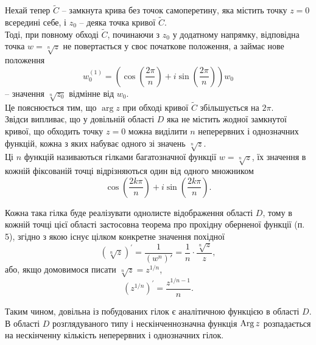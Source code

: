 Нехай тепер $\tilde{C}$ -- замкнута крива без точок самоперетину, яка містить точку $z = 0$ всередині себе, і $z_0$ -- деяка точка кривої $\tilde{C}$. \\

Тоді, при повному обході $\tilde{C}$, починаючи з $z_0$ у додатному напрямку, відповідна точка $w = \sqrt[n]{z}$ не повертається у своє початкове положення, а займає нове положення
\begin{equation}
	\label{eq:3.1.10}
	w_0^{(1)} = \left(\cos \left( \dfrac{2 \pi}{n} \right) + i \sin \left( \dfrac{2 \pi}{n} \right) \right) w_0
\end{equation} -- значення $\sqrt[n]{z_0}$ відмінне від $w_0$. \\

Це пояснюється тим, що $\arg z$ при обході кривої $\tilde{C}$ збільшується на $2 \pi$. \\

Звідси випливає, що у довільній області $D$ яка не містить жодної замкнутої кривої, що обходить точку $z = 0$ можна виділити $n$ неперервних і однозначних функцій, кожна з яких набуває одного зі значень $\sqrt[n]{z}$. \\

Ці $n$ функцій називаються гілками багатозначної функції $w = \sqrt[n]{z}$, їх значення в кожній фіксованій точці відрізняються один від одного множником
\begin{equation}
	\label{eq:3.1.11}
	\cos \left( \dfrac{2 k \pi}{n} \right) + i \sin \left( \dfrac{2 k \pi}{n} \right).
\end{equation}

Кожна така гілка буде реалізувати однолисте відображення області $D$, тому в кожній точці цієї області застосовна теорема про прохідну оберненої функції (п. 5), згідно з якою існує цілком конкретне значення похідної
\begin{equation}
	\label{eq:3.1.12}
	\left( \sqrt[n]{z} \right)^\prime = \dfrac{1}{(w^n)'} = \dfrac{1}{n} \cdot \dfrac{\sqrt[n]{z}}{z},
\end{equation}
або, якщо домовимося писати $\sqrt[n]{z} = z^{1 / n}$,
\begin{equation}
	\label{eq:3.1.13}
	\left( z^{1 / n} \right)^\prime = \dfrac{z^{1 / n - 1}}{n}.
\end{equation}

Таким чином, довільна із побудованих гілок є аналітичною функцією в області $D$. \\

В області $D$ розглядуваного типу і нескінченнозначна функція $\operatorname{Arg} z$ розпадається на нескінченну кількість неперервних і однозначних гілок. \\

